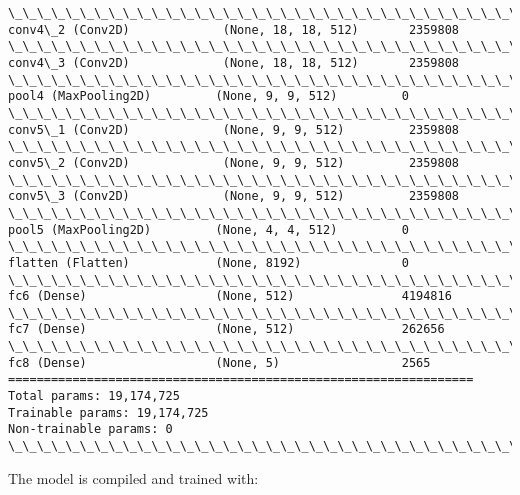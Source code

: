 \documentclass[11pt]{article}
\begin{document}
\begin{Verbatim}[commandchars=\\\{\}]
\_\_\_\_\_\_\_\_\_\_\_\_\_\_\_\_\_\_\_\_\_\_\_\_\_\_\_\_\_\_\_\_\_\_\_\_\_\_\_\_\_\_\_\_\_\_\_\_\_\_\_\_\_\_\_\_\_\_\_\_\_\_\_\_\_
conv4\_2 (Conv2D)             (None, 18, 18, 512)       2359808   
\_\_\_\_\_\_\_\_\_\_\_\_\_\_\_\_\_\_\_\_\_\_\_\_\_\_\_\_\_\_\_\_\_\_\_\_\_\_\_\_\_\_\_\_\_\_\_\_\_\_\_\_\_\_\_\_\_\_\_\_\_\_\_\_\_
conv4\_3 (Conv2D)             (None, 18, 18, 512)       2359808   
\_\_\_\_\_\_\_\_\_\_\_\_\_\_\_\_\_\_\_\_\_\_\_\_\_\_\_\_\_\_\_\_\_\_\_\_\_\_\_\_\_\_\_\_\_\_\_\_\_\_\_\_\_\_\_\_\_\_\_\_\_\_\_\_\_
pool4 (MaxPooling2D)         (None, 9, 9, 512)         0         
\_\_\_\_\_\_\_\_\_\_\_\_\_\_\_\_\_\_\_\_\_\_\_\_\_\_\_\_\_\_\_\_\_\_\_\_\_\_\_\_\_\_\_\_\_\_\_\_\_\_\_\_\_\_\_\_\_\_\_\_\_\_\_\_\_
conv5\_1 (Conv2D)             (None, 9, 9, 512)         2359808   
\_\_\_\_\_\_\_\_\_\_\_\_\_\_\_\_\_\_\_\_\_\_\_\_\_\_\_\_\_\_\_\_\_\_\_\_\_\_\_\_\_\_\_\_\_\_\_\_\_\_\_\_\_\_\_\_\_\_\_\_\_\_\_\_\_
conv5\_2 (Conv2D)             (None, 9, 9, 512)         2359808   
\_\_\_\_\_\_\_\_\_\_\_\_\_\_\_\_\_\_\_\_\_\_\_\_\_\_\_\_\_\_\_\_\_\_\_\_\_\_\_\_\_\_\_\_\_\_\_\_\_\_\_\_\_\_\_\_\_\_\_\_\_\_\_\_\_
conv5\_3 (Conv2D)             (None, 9, 9, 512)         2359808   
\_\_\_\_\_\_\_\_\_\_\_\_\_\_\_\_\_\_\_\_\_\_\_\_\_\_\_\_\_\_\_\_\_\_\_\_\_\_\_\_\_\_\_\_\_\_\_\_\_\_\_\_\_\_\_\_\_\_\_\_\_\_\_\_\_
pool5 (MaxPooling2D)         (None, 4, 4, 512)         0         
\_\_\_\_\_\_\_\_\_\_\_\_\_\_\_\_\_\_\_\_\_\_\_\_\_\_\_\_\_\_\_\_\_\_\_\_\_\_\_\_\_\_\_\_\_\_\_\_\_\_\_\_\_\_\_\_\_\_\_\_\_\_\_\_\_
flatten (Flatten)            (None, 8192)              0         
\_\_\_\_\_\_\_\_\_\_\_\_\_\_\_\_\_\_\_\_\_\_\_\_\_\_\_\_\_\_\_\_\_\_\_\_\_\_\_\_\_\_\_\_\_\_\_\_\_\_\_\_\_\_\_\_\_\_\_\_\_\_\_\_\_
fc6 (Dense)                  (None, 512)               4194816   
\_\_\_\_\_\_\_\_\_\_\_\_\_\_\_\_\_\_\_\_\_\_\_\_\_\_\_\_\_\_\_\_\_\_\_\_\_\_\_\_\_\_\_\_\_\_\_\_\_\_\_\_\_\_\_\_\_\_\_\_\_\_\_\_\_
fc7 (Dense)                  (None, 512)               262656    
\_\_\_\_\_\_\_\_\_\_\_\_\_\_\_\_\_\_\_\_\_\_\_\_\_\_\_\_\_\_\_\_\_\_\_\_\_\_\_\_\_\_\_\_\_\_\_\_\_\_\_\_\_\_\_\_\_\_\_\_\_\_\_\_\_
fc8 (Dense)                  (None, 5)                 2565      
=================================================================
Total params: 19,174,725
Trainable params: 19,174,725
Non-trainable params: 0
\_\_\_\_\_\_\_\_\_\_\_\_\_\_\_\_\_\_\_\_\_\_\_\_\_\_\_\_\_\_\_\_\_\_\_\_\_\_\_\_\_\_\_\_\_\_\_\_\_\_\_\_\_\_\_\_\_\_\_\_\_\_\_\_\_

    \end{Verbatim}

    The model is compiled and trained with:
\end{document}
